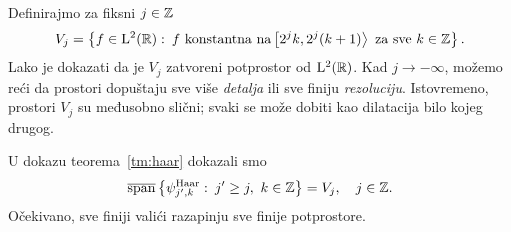 \documentclass[main.tex]{subfiles}
\begin{document}
\begin{komentar}\label{kom:tmhaar2}
	Definirajmo za fiksni \( j \in \mathbb{Z} \)
	\begin{equation}
		V_j = \left\{ f \in \mathrm{L}^2(\mathbb{R}) \, \colon \,
		f \text{ konstantna na} \left[ 2^jk, 2^j(k+1) \right\rangle \text{ za sve } k \in \mathbb{Z}
		\right\}.
	\end{equation}
	Lako je dokazati da je \( V_j \) zatvoreni potprostor od \( \mathrm{L}^2(\mathbb{R}) \).
	Kad \( j \rightarrow -\infty \), možemo reći da prostori dopuštaju
	sve više \emph{detalja} ili sve finiju \emph{rezoluciju}.
	Istovremeno, prostori \( V_j \) su međusobno slični;
	svaki se može dobiti kao dilatacija bilo kojeg drugog.

	U dokazu teorema~\ref{tm:haar} dokazali smo
	\begin{equation}
		\operatorname{\overline{span}} \left\{ \psi^{\mathrm{Haar}}_{j',k} \, \colon \, j' \ge j,\ k \in \mathbb{Z} \right\}
		= V_j, \quad j \in \mathbb{Z}.
	\end{equation}
	Očekivano, sve finiji valići razapinju sve finije potprostore.
\end{komentar}
\end{document}
